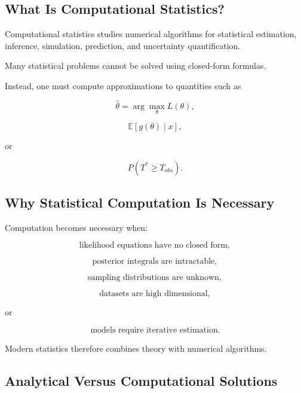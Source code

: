 \subsection{What Is Computational Statistics?}
\label{subsec:what-is-computational-statistics}

Computational statistics studies numerical algorithms for statistical
estimation, inference, simulation, prediction, and uncertainty
quantification.

Many statistical problems cannot be solved using closed-form formulas.

Instead, one must compute approximations to quantities such as

\[
\boxed{
\widehat{\theta}
=
\arg\max_\theta
L(\theta),
}
\]

\[
\boxed{
\mathbb{E}
[
g(\theta)
\mid x
],
}
\]

or

\[
\boxed{
P
(
T^*\geq T_{obs}
).
}
\]

\subsection{Why Statistical Computation Is Necessary}
\label{subsec:why-statistical-computation}

Computation becomes necessary when:

\[
\boxed{
\text{likelihood equations have no closed form},
}
\]

\[
\boxed{
\text{posterior integrals are intractable},
}
\]

\[
\boxed{
\text{sampling distributions are unknown},
}
\]

\[
\boxed{
\text{datasets are high dimensional},
}
\]

or

\[
\boxed{
\text{models require iterative estimation}.
}
\]

Modern statistics therefore combines theory with numerical algorithms.

\subsection{Analytical Versus Computational Solutions}
\label{subsec:analytical-versus-computational}

